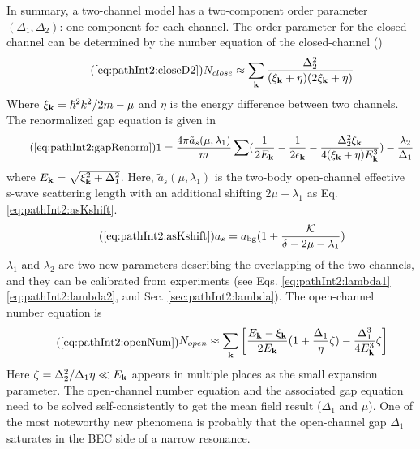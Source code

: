        In  summary, a two-channel model has a two-component order parameter $(\Delta_{1},\Delta_{2})$: one component for each channel.  The order parameter for the closed-channel can be determined by the number equation of the closed-channel ()
\begin{equation}\tag{\ref{eq:pathInt2:closeD2}}
N_{close}\approx\sum_{\vk}\frac{\Delta_{2}^2}{(\xi_{\vk}+\eta)(2\xi_{\vk}+\eta)}
\end{equation}
 Where $\xi_{\mathbf{k}}=\hbar^{2}k^{2}/2m-\mu$ and $\eta$ is the energy difference between two channels. The renormalized gap equation is given in 
 \begin{equation}\tag{\ref{eq:pathInt2:gapRenorm}}
1=\frac{4\pi{\tilde{a}_{s}(\mu,\lambda_{1})}}{m}\sum(\nth{2E_{\vk}}-\nth{2\epsilon_{\vk}}-\frac{\Delta_{2}^{2}\xi_{\vk}}{4(\xi_{\vk}+\eta){E_{\vk}^{3}}})
	-\frac{\lambda_{2}}{\Delta_{1}}
\end{equation}
where $E_{\mathbf{k}}=\sqrt{\xi_{\mathbf{k}}^{2}+\Delta_{1}^{2}}$. Here, $\tilde{a}_{s}(\mu,\lambda_{1})$ is the two-body open-channel effective  s-wave scattering length with  an additional shifting $2\mu+\lambda_{1}$ as Eq. \ref{eq:pathInt2:asKshift}. 
\begin{equation}\tag{\ref{eq:pathInt2:asKshift}}
{a}_{s}=a_{\text{bg}}(1+\frac{\mathcal{K}}{\delta-2\mu-\lambda_{1}})
\end{equation}
  $\lambda_{1}$ and $\lambda_{2}$ are two new parameters describing the overlapping of the two channels, and they can be calibrated from  experiments (see Eqs. \ref{eq:pathInt2:lambda1} \ref{eq:pathInt2:lambda2}, and Sec. \ref{sec:pathInt2:lambda}).  The open-channel number equation is 
\begin{equation}\tag{\ref{eq:pathInt2:openNum}}
\begin{split}
N_{open}\approx\sum_\vk\mbr{\frac{E_\vk-\xi_\vk}{2E_\vk}(1+\frac{\Delta_{1}}{\eta}\zeta)-\frac{\Delta_{1}^{3}}{4E_\vk^{3}}\zeta
	}	
\end{split}
\end{equation}
Here $\zeta=\Delta_{2}^{2}/\Delta_{1}\eta\ll{}E_{\mathbf{k}}$ appears in multiple places as the small expansion parameter.  The open-channel number equation and the associated gap equation need to be solved self-consistently to get  the mean field result ($\Delta_{1}$ and $\mu$).  One of the most noteworthy new phenomena is probably that the open-channel gap $\Delta_{1}$ saturates in the BEC side of  a narrow resonance. 


